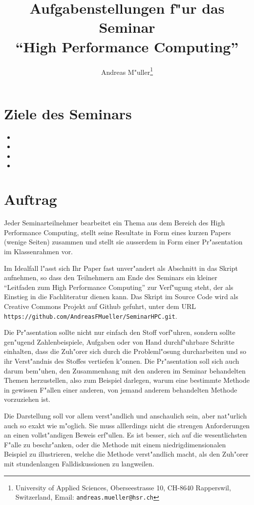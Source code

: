 \documentclass[a4paper,12pt]{article}
\begin{document}
\title{Aufgabenstellungen f"ur das Seminar\\``High Performance Computing''}
\author{Andreas M"uller\footnote{
University of Applied Sciences, Oberseestrasse 10, CH-8640 Rapperswil,
Switzerland, Email: {\tt andreas.mueller@hsr.ch}}}
\date{}
\maketitle
\section{Ziele des Seminars}
\begin{itemize}
\item
\item
\item
\item
\end{itemize}

\section{Auftrag}
Jeder Seminarteilnehmer bearbeitet ein Thema aus dem Bereich des
High Performance Computing,
stellt seine Resultate in Form eines
kurzen Papers (wenige Seiten) zusammen und stellt sie ausserdem
in Form einer Pr"asentation im Klassenrahmen vor.

Im Idealfall l"asst sich Ihr Paper fast unver"andert als Abschnitt
in das Skript aufnehmen, so dass den Teilnehmern am Ende des Seminars
ein kleiner ``Leitfaden zum High Performance Computing'' zur Verf"ugung steht,
der als Einstieg in die Fachliteratur dienen kann.
Das Skript im Source Code wird als Creative Commons Projekt auf
Github gefuhrt, unter dem URL
{\tt https://github.com/AndreasFMueller/SeminarHPC.git}.

Die Pr"asentation sollte nicht nur einfach den Stoff vorf"uhren,
sondern sollte gen"ugend Zahlenbeispiele, Aufgaben oder von Hand
durchf"uhrbare Schritte einhalten, dass die Zuh"orer sich durch
die Probleml"osung durcharbeiten und so ihr Verst"andnis des
Stoffes vertiefen k"onnen. Die Pr"asentation soll sich auch darum
bem"uhen, den Zusammenhang mit den anderen im Seminar behandelten
Themen herzustellen, also zum Beispiel darlegen, warum eine bestimmte
Methode in gewissen F"allen einer anderen, von jemand anderem behandelten
Methode vorzuziehen ist.

Die Darstellung soll vor allem verst"andlich und anschaulich
sein, aber nat"urlich auch so exakt wie m"oglich.
Sie muss alllerdings nicht die strengen Anforderungen an einen
vollst"andigen Beweis erf"ullen. Es ist besser, sich auf die
wesentlichsten F"alle zu beschr"anken, oder die Methode mit
einem niedrigdimensionalen Beispiel zu illustrieren, welche
die Methode verst"andlich macht, als den Zuh"orer mit stundenlangen
Falldiskussionen zu langweilen.
\end{document}
